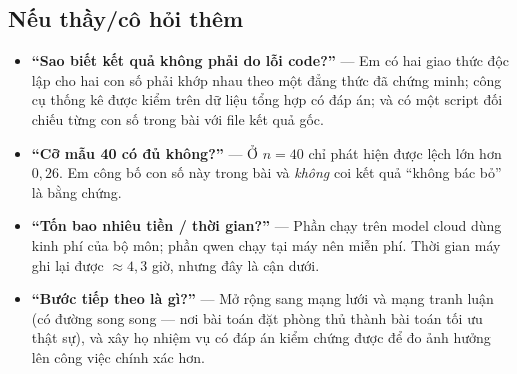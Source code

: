 \documentclass[11pt,a4paper]{article}
\begin{document}
\subsection*{Nếu thầy/cô hỏi thêm}
\begin{itemize}
  \item \textbf{``Sao biết kết quả không phải do lỗi code?''} --- Em có hai giao thức độc
        lập cho hai con số phải khớp nhau theo một đẳng thức đã chứng minh; công cụ thống
        kê được kiểm trên dữ liệu tổng hợp có đáp án; và có một script đối chiếu từng con số
        trong bài với file kết quả gốc.
  \item \textbf{``Cỡ mẫu 40 có đủ không?''} --- Ở $n = 40$ chỉ phát hiện được lệch lớn hơn
        $0{,}26$. Em công bố con số này trong bài và \emph{không} coi kết quả ``không bác
        bỏ'' là bằng chứng.
  \item \textbf{``Tốn bao nhiêu tiền / thời gian?''} --- Phần chạy trên model cloud dùng
        kinh phí của bộ môn; phần qwen chạy tại máy nên miễn phí. Thời gian máy ghi lại
        được $\approx 4{,}3$ giờ, nhưng đây là cận dưới.
  \item \textbf{``Bước tiếp theo là gì?''} --- Mở rộng sang mạng lưới và mạng tranh luận
        (có đường song song --- nơi bài toán đặt phòng thủ thành bài toán tối ưu thật sự),
        và xây họ nhiệm vụ có đáp án kiểm chứng được để đo ảnh hưởng lên công việc chính xác
        hơn.
\end{itemize}
\end{document}
